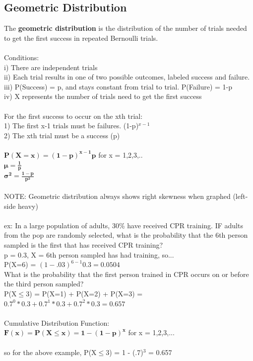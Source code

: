 \documentclass[12pt, a4paper]{article}
\begin{document}
	\subsection{Geometric Distribution}
	The \textbf{geometric distribution} is the distribution of the number of trials needed to get the first success in repeated Bernoulli trials. \\~\\
	Conditions: \\
	i) There are independent trials \\
	ii) Each trial results in one of two possible outcomes, labeled success and failure. \\
	iii) P(Success) = p, and stays constant from trial to trial. P(Failure) = 1-p \\
	iv) X represents the number of trials need to get the first success \\~\\
	For the first success to occur on the xth trial: \\
	1) The first x-1 trials must be failures. (1-p)$^{x-1}$\\
	2) The xth trial must be a success (p) \\~\\
	$\mathbf{P(X=x) = (1-p)^{x-1}p}$ for x = 1,2,3,.. \\
	$\mathbf{\mu = \frac{1}{p}}$ \\
	$\mathbf{\sigma^2 = \frac{1-p}{p^2}}$ \\~\\
	NOTE: Geometric distribution always shows right skewness when graphed (left-side heavy)\\~\\
	ex: In a large population of adults, 30\% have received CPR training. IF adults from the pop are randomly selected, what is the probability that the 6th person sampled is the first that has received CPR training? \\
	p = 0.3, X = 6th person sampled has had training, so... \\
	P(X=6) = $(1-.03)^{6-1}0.3 = 0.0504$ \\
	
	\noindent What is the probability that the first person trained in CPR occurs on or before the third person sampled? \\
	P(X$\leq$3) = P(X=1) + P(X=2) + P(X=3) = $0.7^0*0.3 + 0.7^1*0.3 + 0.7^2*0.3 = 0.657$ \\~\\
	Cumulative Distribution Function: \\
	$\mathbf{F(x) = P(X \leq x) = 1 - (1-p)^x}$ for x = 1,2,3,... \\~\\
	so for the above example, P(X$\leq$3) = 1 - (.7)$^3$ = 0.657 \\~\\
	
\end{document}
